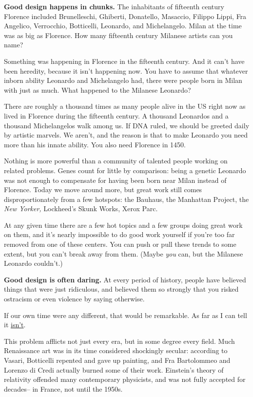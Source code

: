 \textbf{Good design happens in chunks.} The inhabitants of fifteenth
century Florence included Brunelleschi, Ghiberti, Donatello, Masaccio,
Filippo Lippi, Fra Angelico, Verrocchio, Botticelli, Leonardo, and
Michelangelo. Milan at the time was as big as Florence. How many
fifteenth century Milanese artists can you name?

Something was happening in Florence in the fifteenth century. And it
can't have been heredity, because it isn't happening now. You have to
assume that whatever inborn ability Leonardo and Michelangelo had, there
were people born in Milan with just as much. What happened to the
Milanese Leonardo?

There are roughly a thousand times as many people alive in the US right
now as lived in Florence during the fifteenth century. A thousand
Leonardos and a thousand Michelangelos walk among us. If DNA ruled, we
should be greeted daily by artistic marvels. We aren't, and the reason
is that to make Leonardo you need more than his innate ability. You also
need Florence in 1450.

Nothing is more powerful than a community of talented people working on
related problems. Genes count for little by comparison: being a genetic
Leonardo was not enough to compensate for having been born near Milan
instead of Florence. Today we move around more, but great work still
comes disproportionately from a few hotspots: the Bauhaus, the Manhattan
Project, the \emph{New Yorker,} Lockheed's Skunk Works, Xerox Parc.

At any given time there are a few hot topics and a few groups doing
great work on them, and it's nearly impossible to do good work yourself
if you're too far removed from one of these centers. You can push or
pull these trends to some extent, but you can't break away from them.
(Maybe \emph{you} can, but the Milanese Leonardo couldn't.)

\textbf{Good design is often daring.} At every period of history, people
have believed things that were just ridiculous, and believed them so
strongly that you risked ostracism or even violence by saying otherwise.

If our own time were any different, that would be remarkable. As far as
I can tell it \href{say.html}{isn't}.

This problem afflicts not just every era, but in some degree every
field. Much Renaissance art was in its time considered shockingly
secular: according to Vasari, Botticelli repented and gave up painting,
and Fra Bartolommeo and Lorenzo di Credi actually burned some of their
work. Einstein's theory of relativity offended many contemporary
physicists, and was not fully accepted for decades-- in France, not
until the 1950s.


